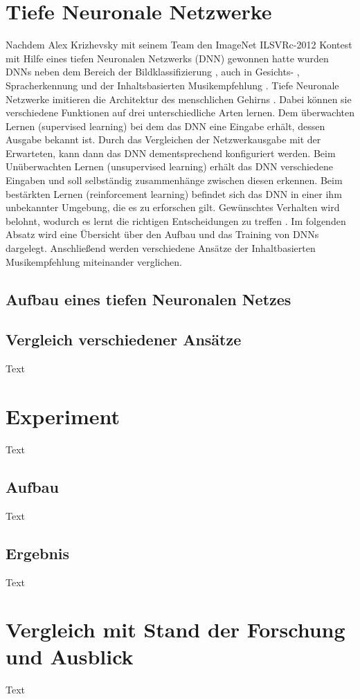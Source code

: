 \documentclass[twosided,a4,10pt]{article}
\begin{document}
\begin{multicols}{2}
\section{Tiefe Neuronale Netzwerke}
Nachdem Alex Krizhevsky mit seinem Team den ImageNet ILSVRc-2012 Kontest mit Hilfe eines tiefen Neuronalen Netzwerks (DNN) gewonnen hatte wurden DNNs neben dem Bereich der Bildklassifizierung \cite{alex}, auch in Gesichts- \cite{ding}, Spracherkennung \cite{graves} und der Inhaltsbasierten Musikempfehlung \cite{oord}. \newline Tiefe Neuronale Netzwerke imitieren die Architektur des menschlichen Gehirns \cite{wang}. Dabei können sie verschiedene Funktionen auf drei unterschiedliche Arten lernen. Dem überwachten Lernen (supervised learning) bei dem das DNN eine Eingabe erhält, dessen Ausgabe bekannt ist. Durch das Vergleichen der Netzwerkausgabe mit der Erwarteten, kann dann das DNN dementsprechend konfiguriert werden. Beim Unüberwachten Lernen (unsupervised learning) erhält das DNN verschiedene Eingaben und soll selbständig zusammenhänge zwischen diesen erkennen. Beim bestärkten Lernen (reinforcement learning) befindet sich das DNN in einer ihm unbekannter Umgebung, die es zu erforschen gilt. Gewünschtes Verhalten wird belohnt, wodurch es lernt die richtigen Entscheidungen zu treffen \cite{wang2}. Im folgenden Absatz wird eine Übersicht über den Aufbau und das Training von DNNs dargelegt. Anschließend werden verschiedene Ansätze der Inhaltbasierten Musikempfehlung miteinander verglichen.

\subsection{Aufbau eines tiefen Neuronalen Netzes}

\subsection{Vergleich verschiedener Ansätze}
Text

\section{Experiment}
Text

\subsection{Aufbau}
Text

\subsection{Ergebnis}
Text

\section{Vergleich mit Stand der Forschung und Ausblick}
Text




\end{multicols}
\end{document}

